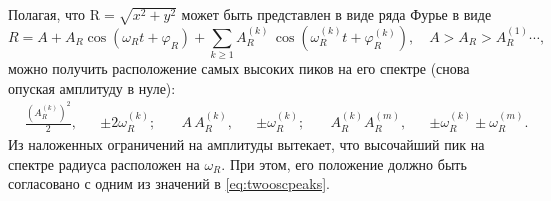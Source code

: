 \documentclass[tikz]{trlnotes}
\begin{document}
Полагая, что $\mathrm{R} = \sqrt{x^2 + y^2}$ может быть представлен в виде ряда Фурье в виде
\begin{equation}
  R = A + A_R \cos (\omega_R t + φ_R) + \sum_{k \geqslant 1} A_R^{(k)}\, \cos (\omega_R^{(k)} t + φ_R^{(k)}),
  \quad A > A_R >A_R^{(1)} \dotsb,
\end{equation}
можно получить расположение самых высоких пиков на его спектре (снова опуская амплитуду в нуле):
\begin{equation}
  \begin{aligned}
    &\frac{\left(A_R^{(k)}\right)^2}{2},& & \pm 2\omega_R^{(k)}; \quad
    &A\,A_R^{(k)}, && \pm \omega_R^{(k)}                       ; \quad
    &A_R^{(k)} A_R^{(m)},&& \pm \omega_R^{(k)} \pm \omega_R^{(m)}.
  \end{aligned}
\end{equation}
Из наложенных ограничений на амплитуды вытекает, что высочайший пик на спектре радиуса расположен на $\omega_R$.
При этом, его положение должно быть согласовано с одним из значений в \eqref{eq:twooscpeaks}.
\end{document}

